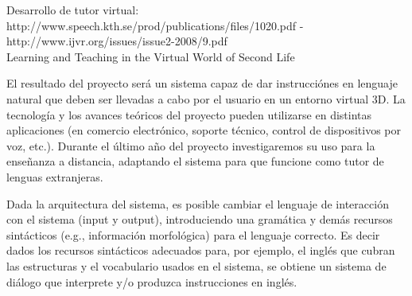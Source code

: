 
%
%
%
%
%
%
%
%
%




Desarrollo de tutor virtual: 
http://www.speech.kth.se/prod/publications/files/1020.pdf - \\
http://www.ijvr.org/issues/issue2-2008/9.pdf \\
Learning and Teaching in the Virtual World of Second Life\\

\citep{Eskenazi09, Wik09, Doswell05}


El resultado del proyecto ser\'a un sistema capaz de dar instrucci\'ones
en lenguaje natural que deben ser llevadas a cabo por el usuario en un
entorno virtual 3D.  La tecnolog\'ia y los avances te\'oricos del proyecto
pueden utilizarse en distintas aplicaciones (en comercio electr\'onico,
soporte t\'ecnico, control de dispositivos por voz, etc.).  Durante el
\'ultimo a\~no del proyecto investigaremos su uso para la ense\~nanza a
distancia, adaptando el sistema para que funcione como tutor de lenguas
extranjeras.

Dada la arquitectura del sistema, es posible cambiar el lenguaje de
interacci\'on con el sistema (input y output), introduciendo
una gram\'atica y dem\'as recursos sint\'acticos (e.g., informaci\'on
morfol\'ogica) para el lenguaje correcto.  Es decir dados los recursos
sint\'acticos adecuados para, por ejemplo, el ingl\'es que cubran las
estructuras y el vocabulario usados en el sistema, se obtiene un sistema
de di\'alogo que interprete y/o produzca instrucciones en ingl\'es.

